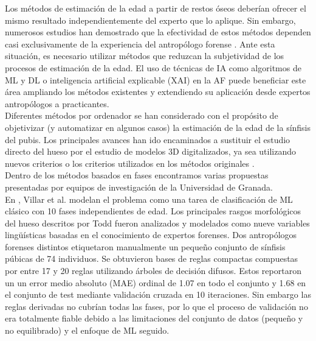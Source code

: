 Los métodos de estimación de la edad a partir de restos óseos deberían ofrecer el mismo resultado independientemente del experto que lo aplique. Sin embargo, numerosos estudios han demostrado que la efectividad de estos métodos dependen casi exclusivamente de la experiencia del antropólogo forense \cite{schmitt2002variability,kimmerle2008inter}. Ante esta situación, es necesario utilizar métodos que reduzcan la subjetividad de los procesos de estimación de la edad. El uso de técnicas de IA como algoritmos de ML y DL o inteligencia artificial explicable (XAI) en la AF puede beneficiar este área ampliando los métodos existentes y extendiendo su aplicación desde expertos antropólogos a practicantes.\\

Diferentes métodos por ordenador se han considerado con el propósito de objetivizar (y automatizar en algunos casos) la estimación de la edad de la sínfisis del pubis. Los principales avances han ido encaminados a sustituir el estudio directo del hueso por el estudio de modelos 3D digitalizados, ya sea utilizando nuevos criterios o los criterios utilizados en los métodos originales \cite{dedouit2007virtual}.\\

Dentro de los métodos basados en fases encontramos varias propuestas presentadas por equipos de investigación de la Universidad de Granada.\\

En \cite{villar2017first}, Villar et al. modelan el problema como una tarea de clasificación de ML clásico con 10 fases independientes de edad. Los principales rasgos morfológicos del hueso descritos por Todd fueron analizados y modelados como nueve variables lingüísticas basadas en el conocimiento de expertos forenses. Dos antropólogos forenses distintos etiquetaron manualmente un pequeño conjunto de sínfisis púbicas de 74 individuos. Se obtuvieron bases de reglas compactas compuestas por entre 17 y 20 reglas utilizando árboles de decisión difusos. Estos reportaron un un error medio absoluto (MAE) ordinal de 1.07 en todo el conjunto y 1.68 en el conjunto de test mediante validación cruzada en 10 iteraciones. Sin embargo las reglas derivadas no cubrían todas las fases, por lo que el proceso de validación no era totalmente fiable debido a las limitaciones del conjunto de datos (pequeño y no equilibrado) y el enfoque de ML seguido.\\

